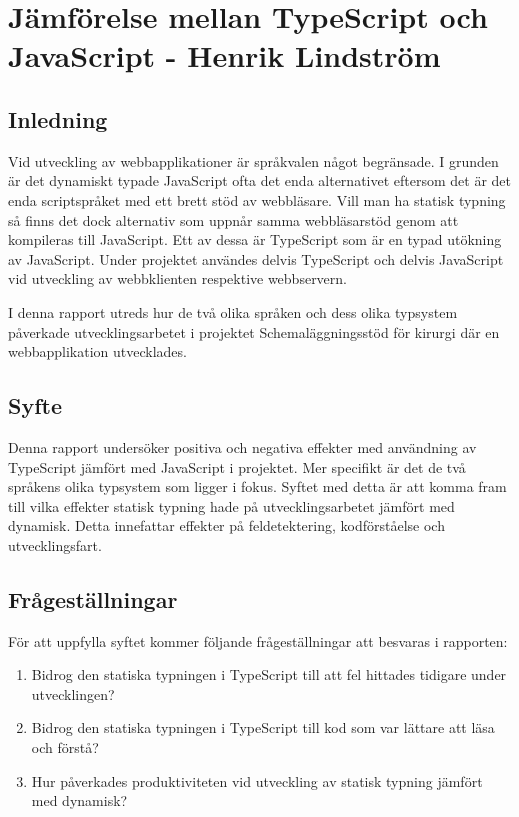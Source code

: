 \chapter{Jämförelse mellan TypeScript och JavaScript - Henrik Lindström}

\section{Inledning}
Vid utveckling av webbapplikationer är språkvalen något begränsade. I grunden är det dynamiskt typade JavaScript ofta det enda alternativet eftersom det är det enda scriptspråket med ett brett stöd av webbläsare. Vill man ha statisk typning så finns det dock alternativ som uppnår samma webbläsarstöd genom att kompileras till JavaScript. Ett av dessa är TypeScript som är en typad utökning av JavaScript. Under projektet användes delvis TypeScript och delvis JavaScript vid utveckling av webbklienten respektive webbservern.

I denna rapport utreds hur de två olika språken och dess olika typsystem påverkade utvecklingsarbetet i projektet Schemaläggningsstöd för kirurgi där en webbapplikation utvecklades.
\section{Syfte}
Denna rapport undersöker positiva och negativa effekter med användning av TypeScript jämfört med JavaScript i projektet. Mer specifikt är det de två språkens olika typsystem som ligger i fokus. Syftet med detta är att komma fram till vilka effekter statisk typning hade på utvecklingsarbetet jämfört med dynamisk. Detta innefattar effekter på feldetektering, kodförståelse och utvecklingsfart. 

\section{Frågeställningar}
För att uppfylla syftet kommer följande frågeställningar att besvaras i rapporten:
\begin{enumerate}
\item Bidrog den statiska typningen i TypeScript till att fel hittades tidigare under utvecklingen?
\item Bidrog den statiska typningen i TypeScript till kod som var lättare att läsa och förstå?
\item Hur påverkades produktiviteten vid utveckling av statisk typning jämfört med dynamisk?
\end{enumerate}
